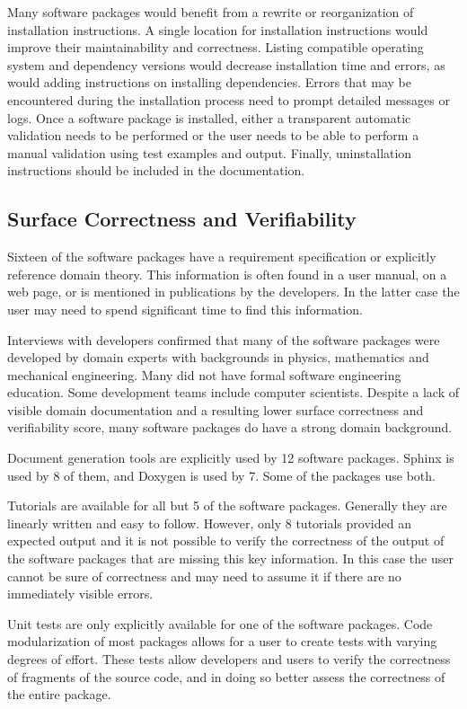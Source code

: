 \documentclass[12pt, notitlepage]{article}
\begin{document}
Many software packages would benefit from a rewrite or reorganization of installation instructions. A single location for installation instructions would improve their maintainability and correctness. Listing compatible operating system and dependency versions would decrease installation time and errors, as would adding instructions on installing dependencies. Errors that may be encountered during the installation process need to prompt detailed messages or logs. Once a software package is installed, either a transparent automatic validation needs to be performed or the user needs to be able to perform a manual validation using test examples and output. Finally, uninstallation instructions should be included in the documentation. 
 
\subsection{Surface Correctness and Verifiability}

Sixteen of the software packages have a requirement specification or explicitly reference domain theory. This information is often found in a user manual, on a web page, or is mentioned in publications by the developers. In the latter case the user may need to spend significant time to find this information. 

Interviews with developers confirmed that many of the software packages were developed by domain experts with backgrounds in physics, mathematics and mechanical engineering. Many did not have formal software engineering education. Some development teams include computer scientists. Despite a lack of visible domain documentation and a resulting lower surface correctness and verifiability score, many software packages do have a strong domain background. 

Document generation tools are explicitly used by 12 software packages. Sphinx is used by 8 of them, and Doxygen is used by 7. Some of the packages use both.

Tutorials are available for all but 5 of the software packages. Generally they are linearly written and easy to follow. However, only 8 tutorials provided an expected output and it is not possible to verify the correctness of the output of the software packages that are missing this key information. In this case the user cannot be sure of correctness and may need to assume it if there are no immediately visible errors. 

Unit tests are only explicitly available for one of the software packages. Code modularization of most packages allows for a user to create tests with varying degrees of effort. These tests allow developers and users to verify the correctness of fragments of the source code, and in doing so better assess the correctness of the entire package.
\end{document}
